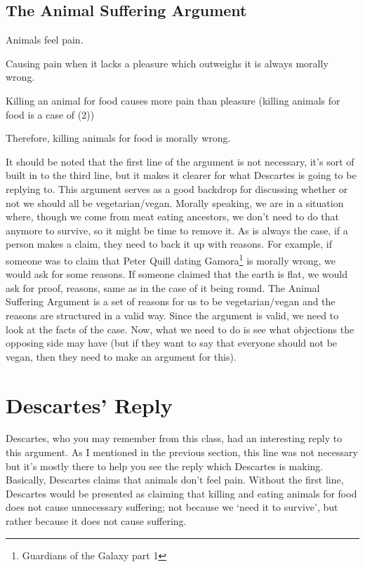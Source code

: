 \subsection{The Animal Suffering Argument} 
\begin{earg}
    \item[1] Animals feel pain.
    \item[2] Causing pain when it lacks a pleasure which outweighs it is always morally wrong.
    \item[3] Killing an animal for food causes more pain than pleasure (killing animals for food is a case of (2))
    \item[4] Therefore, killing animals for food is morally wrong.
\end{earg}

It should be noted that the first line of the argument is not necessary, it's sort of built in to the third line, but it makes it clearer for what Descartes is going to be replying to. This argument serves as a good backdrop for discussing whether or not we should all be vegetarian/vegan. Morally speaking, we are in a situation where, though we come from meat eating ancestors, we don't need to do that anymore to survive, so it might be time to remove it.  As is always the case, if a person makes a claim, they need to back it up with reasons. For example, if someone was to claim that Peter Quill dating Gamora\footnote{Guardians of the Galaxy part 1} is morally wrong, we would ask for some reasons. If someone claimed that the earth is flat, we would ask for proof, reasons, same as in the case of it being round.  The Animal Suffering Argument is a set of reasons for us to be vegetarian/vegan and the reasons are structured in a valid way. Since the argument is valid, we need to look at the facts of the case. Now, what we need to do is see what objections the opposing side may have (but if they want to say that everyone should not be vegan, then they need to make an argument for this).

\section{Descartes' Reply}

Descartes, who you may remember from this class, had an interesting reply to this argument. As I mentioned in the previous section, this line was not necessary but it's mostly there to help you see the reply which Descartes is making. Basically, Descartes claims that animals don't feel pain. Without the first line, Descartes would be presented as claiming that killing and eating animals for food does not cause unnecessary suffering; not because we `need it to survive', but rather because it does not cause suffering.  

